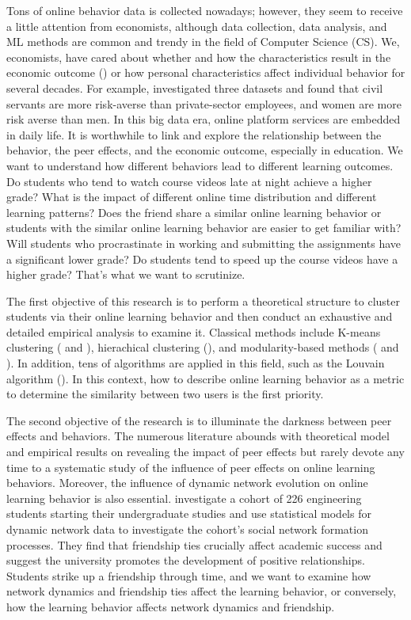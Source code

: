 \documentclass[a4paper]{article}
\theoremstyle{plain}
\begin{document}
Tons of online behavior data is collected nowadays; however,
they seem to receive a little attention from economists, although data collection,
data analysis, and ML methods are common and trendy in the field of Computer Science (CS).
We, economists, have cared about whether and how the characteristics 
result in the economic outcome (\citet{char}) or how personal characteristics
affect individual behavior for several decades.
For example, \citet{risk} investigated three datasets and found that
civil servants are more risk-averse than private-sector employees, 
and women are more risk averse than men.
In this big data era, online platform services are embedded in daily life.
It is worthwhile to link and explore the relationship between the behavior,
the peer effects, and the economic outcome, especially in education.
We want to understand how different behaviors lead to different learning outcomes.
Do students who tend to watch course videos late at night achieve a higher grade?
What is the impact of different online time distribution and different learning patterns?
Does the friend share a similar online learning behavior or students with the 
similar online learning behavior are easier to get familiar with?
Will students who procrastinate
in working and submitting the assignments have a significant lower grade? 
Do students tend to speed up the course videos have a higher grade?
That's what we want to scrutinize.

The first objective of this research is to perform a theoretical structure
to cluster students via their online learning behavior and then conduct an
exhaustive and detailed empirical analysis to examine it.
Classical methods include K-means clustering (\citet{kmeans} and \citet{kmeansnew}), 
hierachical clustering (\citet{hier}), 
and modularity-based methods (\citet{mod} and \citet{mod2}). 
In addition, tens of algorithms are applied in this field, such as the Louvain algorithm
(\citet{luv}).
In this context, how to describe online learning behavior as a metric to determine the similarity
between two users is the first priority.

The second objective of the research
is to illuminate the darkness between peer effects and behaviors.
The numerous literature abounds with theoretical model and empirical results 
on revealing the impact of peer effects 
but rarely devote any time to a systematic study of the influence of
peer effects on online learning behaviors.
Moreover, the influence of dynamic network evolution on online learning behavior
is also essential.
\citet{dynamic} investigate a cohort of 226 engineering students starting their
undergraduate studies and use statistical models for 
dynamic network data to investigate the cohort's social network formation processes.
They find that friendship ties crucially affect academic success and suggest the
university promotes the development of positive relationships.
Students strike up a friendship through time, and 
we want to examine how network dynamics and friendship ties affect the learning behavior,
or conversely, how the learning behavior affects network dynamics and friendship.
\end{document}
